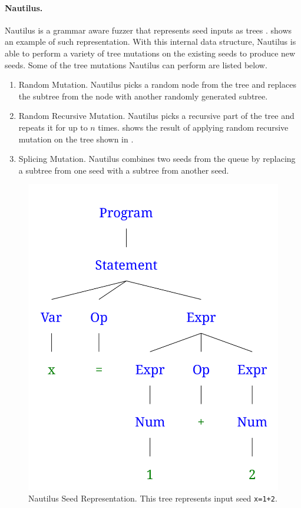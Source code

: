 \paragraph{Nautilus.}
Nautilus is a grammar aware fuzzer that represents seed inputs as trees \cite{aschermann_frassetto_holz_jauernig_sadeghi_teuchert_2019}.  shows an example of such representation. With this internal data structure, Nautilus is able to perform a variety of tree mutations on the existing seeds to produce new seeds. Some of the tree mutations Nautilus can perform are listed below.
\begin{enumerate}
    \item Random Mutation. Nautilus picks a random node from the tree and replaces the subtree from the node with another randomly generated subtree.
    \item Random Recursive Mutation. Nautilus picks a recursive part of the tree and repeats it for up to $n$ times.  shows the result of applying random recursive mutation on the tree shown in .
    \item Splicing Mutation. Nautilus combines two seeds from the queue by replacing a subtree from one seed with a subtree from another seed.
\end{enumerate}
\begin{figure}[h]
  \centering
  \includegraphics[scale=0.15]{images/parse-tree1.png}
  \caption{Nautilus Seed Representation. This tree represents input seed \texttt{x=1+2}.}\label{nautilus-tree-representation}
\end{figure}

